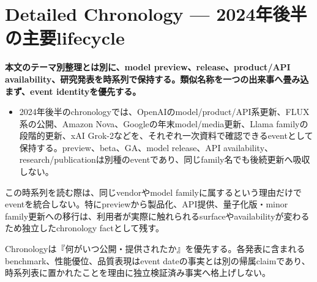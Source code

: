 \section{Detailed Chronology — 2024年後半の主要lifecycle}
\label{pkg:chronology}
\noindent\textbf{本文のテーマ別整理とは別に、model preview、release、product/API availability、研究発表を時系列で保持する。類似名称を一つの出来事へ畳み込まず、event identityを優先する。}\autocite{src-10b59b402b80,src-c3a08c57269d}

\begin{itemize}
  \item 2024年後半のchronologyでは、OpenAIのmodel/product/API系更新、FLUX系の公開、Amazon Nova、Googleの年末model/media更新、Llama familyの段階的更新、xAI Grok-2などを、それぞれ一次資料で確認できるeventとして保持する。preview、beta、GA、model release、API availability、research/publicationは別種のeventであり、同じfamily名でも後続更新へ吸収しない。
\end{itemize}
\autocite{src-10b59b402b80,src-1572648d0de9,src-5db07766b472,src-6bbe9721db06,src-99e6401ec31b,src-bc9a95ff1e00,src-c3a08c57269d,src-e92e95daf8e0}

この時系列を読む際は、同じvendorやmodel familyに属するという理由だけでeventを統合しない。特にpreviewから製品化、API提供、量子化版・minor family更新への移行は、利用者が実際に触れられるsurfaceやavailabilityが変わるため独立したchronology factとして残す。\autocite{src-10b59b402b80,src-6bbe9721db06}


\begin{claimboundary}
Chronologyは『何がいつ公開・提供されたか』を優先する。各発表に含まれるbenchmark、性能優位、品質表現はevent dateの事実とは別の帰属claimであり、時系列表に置かれたことを理由に独立検証済み事実へ格上げしない。\autocite{src-bc9a95ff1e00}
\end{claimboundary}
